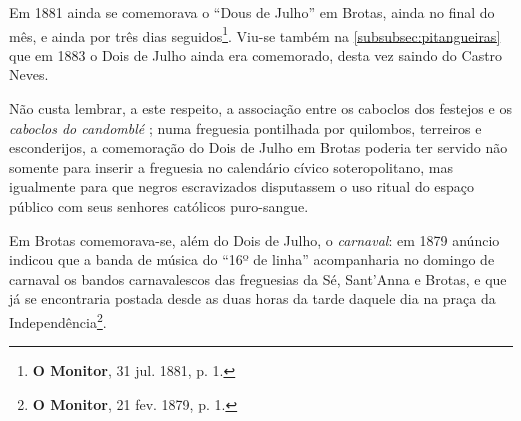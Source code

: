 Em 1881 ainda se comemorava o ``Dous de Julho'' em Brotas, ainda no final do mês, e ainda por três dias seguidos\footnote{\textbf{O Monitor}, 31 jul. 1881, p. 1.}. Viu-se também na \autoref{subsubsec:pitangueiras} que em 1883 o Dois de Julho ainda era comemorado, desta vez saindo do Castro Neves.

Não custa lembrar, a este respeito, a associação entre os caboclos dos festejos e os \textit{caboclos do candomblé} \cite[p.~88-91]{albuquerque_doisdejulho_1997}; numa freguesia pontilhada por quilombos, terreiros e esconderijos, a comemoração do Dois de Julho em Brotas poderia ter servido não somente para inserir a freguesia no calendário cívico soteropolitano, mas igualmente para que negros escravizados disputassem o uso ritual do espaço público com seus senhores católicos puro-sangue. 

Em Brotas comemorava-se, além do Dois de Julho, o \textit{carnaval}: em 1879 anúncio indicou que a banda de música do ``16º de linha'' acompanharia no domingo de carnaval os bandos carnavalescos das freguesias da Sé, Sant'Anna e Brotas, e que já se encontraria postada desde as duas horas da tarde daquele dia na praça da Independência\footnote{\textbf{O Monitor}, 21 fev. 1879, p. 1.}.